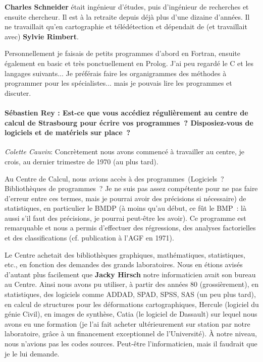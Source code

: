 \textbf{Charles Schneider} était ingénieur d’études, puis d’ingénieur de recherches et ensuite chercheur. Il est à la retraite depuis déjà plus d’une dizaine d’années. Il ne travaillait qu’en cartographie et télédétection et dépendait de (et travaillait avec) \textbf{Sylvie Rimbert}. 

Personnellement je faisais de petits programmes d’abord en Fortran, ensuite également en basic et très ponctuellement en Prolog. J’ai peu regardé le C et les langages suivants... Je préférais faire les organigrammes des méthodes à programmer pour les spécialistes... mais je pouvais lire les programmes et discuter. 

\paragraph*{Sébastien Rey : Est-ce que vous accédiez régulièrement au centre de calcul de Strasbourg pour écrire vos programmes ? Disposiez-vous de logiciels et de matériels sur place ?}

\noindent\emph{Colette Cauvin}:  Concrètement nous avons commencé à travailler au centre, je crois, au dernier trimestre de 1970 (au plus tard). 

Au Centre de Calcul, nous avions accès à des programmes (Logiciels ? Bibliothèques de programmes ? Je ne suis pas assez compétente pour ne pas faire d’erreur entre ces termes, mais je pourrai avoir des précisions si nécessaire) de statistiques, en particulier le BMDP (à moins qu’au début, ce fût le BMP : là aussi s’il faut des précisions, je pourrai peut-être les avoir). Ce programme est remarquable et nous a permis d’effectuer des régressions, des analyses factorielles et des classifications (cf. publication à l’AGF en 1971).

Le Centre achetait des bibliothèques graphiques, mathématiques, statistiques, etc., en fonction des demandes des grands laboratoires. Nous en étions avisés d’autant plus facilement que \textbf{Jacky Hirsch} notre informaticien avait son bureau au Centre. Ainsi nous avons pu utiliser, à partir des années 80 (grossièrement), en statistiques, des logiciels comme ADDAD, SPAD, SPSS, SAS (un peu plus tard), en calcul de structures pour les déformations cartographiques, Hercule (logiciel du génie Civil), en images de synthèse, Catia (le logiciel de Dassault) sur lequel nous avons eu une formation (je l’ai fait acheter ultérieurement sur station par notre laboratoire, grâce à un financement exceptionnel de l’Université). À notre niveau, nous n’avions pas les codes sources. Peut-être l’informaticien, mais il faudrait que je le lui demande. 

